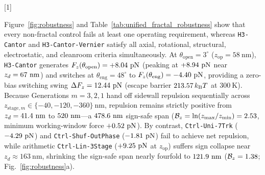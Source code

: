 \documentclass[pdflatex,sn-nature]{sn-jnl}
\newenvironment{scaledtableenv}{%
  \let\fceorigtabular\tabular
  \let\endfceorigtabular\endtabular
  \RenewEnviron{tabular}[1]{\resizebox{\textwidth}{!}{\fceorigtabular{##1}\BODY\endfceorigtabular}}%
}{}
\begin{document}
\begin{scaledtableenv}

\end{scaledtableenv}

Figure~\ref{fig:robustness} and Table~\ref{tab:unified_fractal_robustness} show that every non-fractal control fails at least one operating requirement, whereas \texttt{H3-Cantor} and \texttt{H3-Cantor-Vernier} satisfy all axial, rotational, structural, electrostatic, and cleanroom criteria simultaneously. At $\theta_{\mathrm{open}}=3^\circ$ ($z_{\mathrm{op}}=58\ \mathrm{nm}$), \texttt{H3-Cantor} generates $F_z(\theta_{\mathrm{open}}) = +8.04{}\ \mathrm{pN}$ (peaking at $\HthreeSymFzPeakDisp{}\ \mathrm{pN}$ near $z_d = 67{}\ \mathrm{nm}$) and switches at $\theta_{\mathrm{eng}}=48^\circ$ to $F_z(\theta_{\mathrm{eng}}) = -4.40{}\ \mathrm{pN}$, providing a zero-bias switching swing $\Delta F_z = 12.44{}\ \mathrm{pN}$ (escape barrier $213.57{}\,k_{\mathrm{B}}T$ at $300\ \mathrm{K}$). Because Generations $m=3,2,1$ hand off sidewall repulsion sequentially across $z_{\mathrm{stage},m} \in \{-40,-120,-360\}\ \mathrm{nm}$, repulsion remains strictly positive from $z_d = 41.4{}\ \mathrm{nm}$ to $520{}\ \mathrm{nm}$---a $478.6{}\ \mathrm{nm}$ sign-safe span ($\mathcal{B}_z = \ln(z_{\max}/z_{\min}) = 2.53{}$, minimum working-window force $\RobTblHthreeCantorSymTwoxtwoxtwoMinFz{}\ \mathrm{pN}$). By contrast, \texttt{Ctrl-Uni-7Trk} ($\RobTblCtrlUniSeventrkFzOpen{}\ \mathrm{pN}$) and \texttt{Ctrl-Shuf-OutPhase} ($\RobTblCtrlShufOutphaseFzOpen{}\ \mathrm{pN}$) fail to achieve net repulsion, while arithmetic \texttt{Ctrl-Lin-3Stage} ($\RobTblCtrlLinThreestageFzOpen{}\ \mathrm{pN}$ at $z_{\mathrm{op}}$) suffers sign collapse near $z_d \approx 163\ \mathrm{nm}$, shrinking the sign-safe span nearly fourfold to $\RobTblCtrlLinThreestageSpanNm{}\ \mathrm{nm}$ ($\mathcal{B}_z = 1.38{}$; Fig.~\ref{fig:robustness}a).
\end{document}
